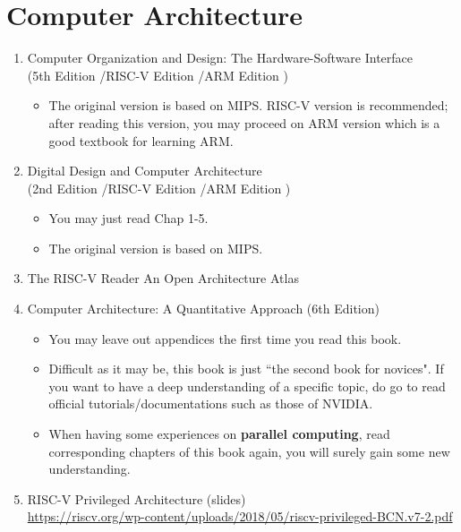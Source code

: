 \documentclass{article}
\begin{document}
\section{Computer Architecture}
\begin{enumerate}
    \item Computer Organization and Design: The Hardware-Software Interface\\
    (5th Edition \cite{patterson2013computerMIPS}/RISC-V Edition \cite{pattersoncomputerRV}/ARM Edition \cite{patterson2016computerARM})
    \begin{itemize}
        \item The original version is based on MIPS.
        RISC-V version is recommended; after reading this version, you may proceed on ARM version which is a good textbook for learning ARM.
    \end{itemize}
    \item Digital Design and Computer Architecture\\
    (2nd Edition \cite{harris2015digitalMIPS}/RISC-V Edition \cite{harris2021digitalRV}/ARM Edition \cite{harris2015digitalARM})
    \begin{itemize}
        \item You may just read Chap 1-5.
        \item The original version is based on MIPS.
    \end{itemize}
    \item The RISC-V Reader An Open Architecture Atlas \cite{patterson2017risc}
    \item Computer Architecture: A Quantitative Approach (6th Edition) \cite{hennessy2018computer}
    \begin{itemize}
        \item You may leave out appendices the first time you read this book.
        \item Difficult as it may be, this book is just ``the second book for novices".
        If you want to have a deep understanding of a specific topic, do go to read official tutorials/documentations such as those of NVIDIA.
        \item When having some experiences on \textbf{parallel computing}, read corresponding chapters of this book again, you will surely gain some new understanding.
    \end{itemize}
    \item RISC-V Privileged Architecture (slides)\\
    \href{https://riscv.org/wp-content/uploads/2018/05/riscv-privileged-BCN.v7-2.pdf}{https://riscv.org/wp-content/uploads/2018/05/riscv-privileged-BCN.v7-2.pdf}

\end{enumerate}
\end{document}
